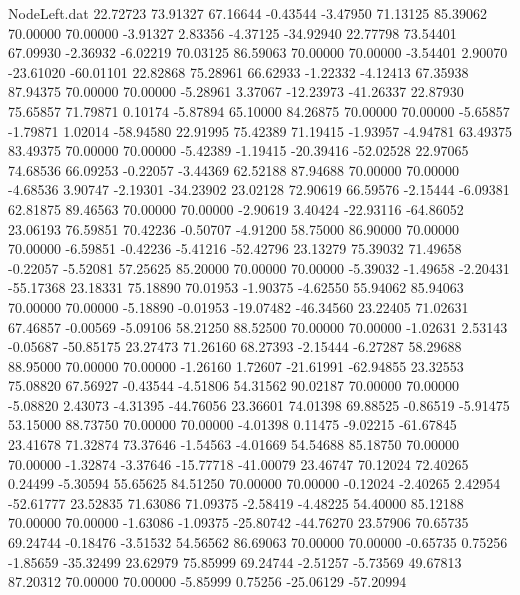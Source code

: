 \begin{filecontents}{NodeLeft.dat}
  22.72723   73.91327   67.16644    -0.43544   -3.47950   71.13125   85.39062   70.00000   70.00000   -3.91327    2.83356   -4.37125  -34.92940
  22.77798   73.54401   67.09930    -2.36932   -6.02219   70.03125   86.59063   70.00000   70.00000   -3.54401    2.90070  -23.61020  -60.01101
  22.82868   75.28961   66.62933    -1.22332   -4.12413   67.35938   87.94375   70.00000   70.00000   -5.28961    3.37067  -12.23973  -41.26337
  22.87930   75.65857   71.79871     0.10174   -5.87894   65.10000   84.26875   70.00000   70.00000   -5.65857   -1.79871    1.02014  -58.94580
  22.91995   75.42389   71.19415    -1.93957   -4.94781   63.49375   83.49375   70.00000   70.00000   -5.42389   -1.19415  -20.39416  -52.02528
  22.97065   74.68536   66.09253    -0.22057   -3.44369   62.52188   87.94688   70.00000   70.00000   -4.68536    3.90747   -2.19301  -34.23902
  23.02128   72.90619   66.59576    -2.15444   -6.09381   62.81875   89.46563   70.00000   70.00000   -2.90619    3.40424  -22.93116  -64.86052
  23.06193   76.59851   70.42236    -0.50707   -4.91200   58.75000   86.90000   70.00000   70.00000   -6.59851   -0.42236   -5.41216  -52.42796
  23.13279   75.39032   71.49658    -0.22057   -5.52081   57.25625   85.20000   70.00000   70.00000   -5.39032   -1.49658   -2.20431  -55.17368
  23.18331   75.18890   70.01953    -1.90375   -4.62550   55.94062   85.94063   70.00000   70.00000   -5.18890   -0.01953  -19.07482  -46.34560
  23.22405   71.02631   67.46857    -0.00569   -5.09106   58.21250   88.52500   70.00000   70.00000   -1.02631    2.53143   -0.05687  -50.85175
  23.27473   71.26160   68.27393    -2.15444   -6.27287   58.29688   88.95000   70.00000   70.00000   -1.26160    1.72607  -21.61991  -62.94855
  23.32553   75.08820   67.56927    -0.43544   -4.51806   54.31562   90.02187   70.00000   70.00000   -5.08820    2.43073   -4.31395  -44.76056
  23.36601   74.01398   69.88525    -0.86519   -5.91475   53.15000   88.73750   70.00000   70.00000   -4.01398    0.11475   -9.02215  -61.67845
  23.41678   71.32874   73.37646    -1.54563   -4.01669   54.54688   85.18750   70.00000   70.00000   -1.32874   -3.37646  -15.77718  -41.00079
  23.46747   70.12024   72.40265     0.24499   -5.30594   55.65625   84.51250   70.00000   70.00000   -0.12024   -2.40265    2.42954  -52.61777
  23.52835   71.63086   71.09375    -2.58419   -4.48225   54.40000   85.12188   70.00000   70.00000   -1.63086   -1.09375  -25.80742  -44.76270
  23.57906   70.65735   69.24744    -0.18476   -3.51532   54.56562   86.69063   70.00000   70.00000   -0.65735    0.75256   -1.85659  -35.32499
  23.62979   75.85999   69.24744    -2.51257   -5.73569   49.67813   87.20312   70.00000   70.00000   -5.85999    0.75256  -25.06129  -57.20994

\end{filecontents}
